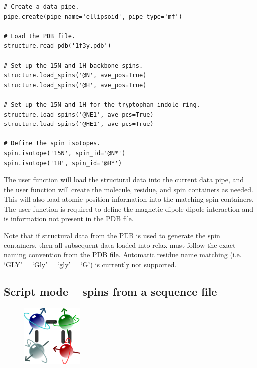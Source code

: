 \begin{lstlisting}
# Create a data pipe.
pipe.create(pipe_name='ellipsoid', pipe_type='mf')

# Load the PDB file.
structure.read_pdb('1f3y.pdb')

# Set up the 15N and 1H backbone spins.
structure.load_spins('@N', ave_pos=True)
structure.load_spins('@H', ave_pos=True)

# Set up the 15N and 1H for the tryptophan indole ring.
structure.load_spins('@NE1', ave_pos=True)
structure.load_spins('@HE1', ave_pos=True)

# Define the spin isotopes.
spin.isotope('15N', spin_id='@N*')
spin.isotope('1H', spin_id='@H*')
\end{lstlisting}

The  user function will load the structural data into the current data pipe, and the  user function will create the molecule, residue, and spin containers as needed.  This will also load atomic position information into the matching spin containers.  The  user function is required to define the magnetic dipole-dipole interaction and is information not present in the PDB file.

Note that if structural data from the PDB is used to generate the spin containers, then all subsequent data loaded into relax must follow the exact naming convention from the PDB file.  Automatic residue name matching (i.e. `GLY' = `Gly' = `gly' = `G') is currently not supported.




\subsection{Script mode -- spins from a sequence file} \label{sect: script - sequence file}

\begin{figure}[h]
\includegraphics[width=3cm, bb=0 0 1701 1701]{graphics/misc/sequence_600x600}
\end{figure}

